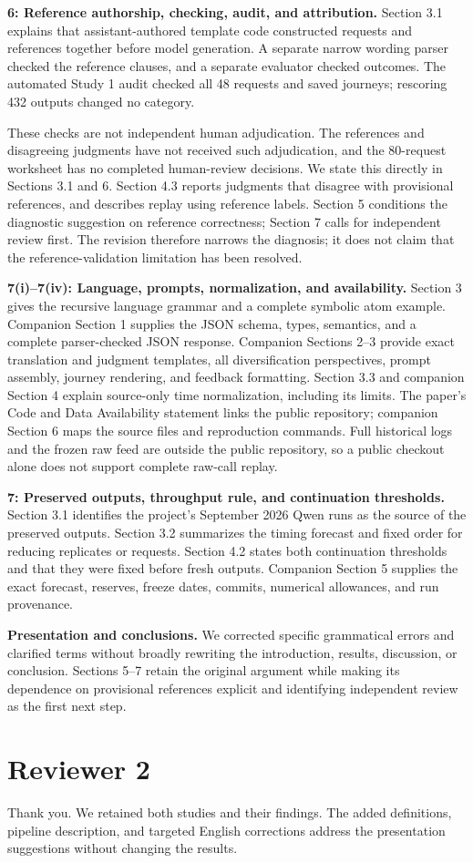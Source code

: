 \documentclass[11pt,a4paper]{scrartcl}
\begin{document}
\textbf{6: Reference authorship, checking, audit, and attribution.}
Section 3.1 explains that assistant-authored template code constructed requests and references together before model generation. A separate narrow wording parser checked the reference clauses, and a separate evaluator checked outcomes. The automated Study 1 audit checked all 48 requests and saved journeys; rescoring 432 outputs changed no category.

These checks are not independent human adjudication. The references and disagreeing judgments have not received such adjudication, and the 80-request worksheet has no completed human-review decisions. We state this directly in Sections 3.1 and 6. Section 4.3 reports judgments that disagree with provisional references, and describes replay using reference labels. Section 5 conditions the diagnostic suggestion on reference correctness; Section 7 calls for independent review first. The revision therefore narrows the diagnosis; it does not claim that the reference-validation limitation has been resolved.

\textbf{7(i)--7(iv): Language, prompts, normalization, and availability.}
Section 3 gives the recursive language grammar and a complete symbolic atom example. Companion Section 1 supplies the JSON schema, types, semantics, and a complete parser-checked JSON response. Companion Sections 2--3 provide exact translation and judgment templates, all diversification perspectives, prompt assembly, journey rendering, and feedback formatting. Section 3.3 and companion Section 4 explain source-only time normalization, including its limits. The paper's Code and Data Availability statement links the public repository; companion Section 6 maps the source files and reproduction commands. Full historical logs and the frozen raw feed are outside the public repository, so a public checkout alone does not support complete raw-call replay.

\textbf{7: Preserved outputs, throughput rule, and continuation thresholds.}
Section 3.1 identifies the project's September 2026 Qwen runs as the source of the preserved outputs. Section 3.2 summarizes the timing forecast and fixed order for reducing replicates or requests. Section 4.2 states both continuation thresholds and that they were fixed before fresh outputs. Companion Section 5 supplies the exact forecast, reserves, freeze dates, commits, numerical allowances, and run provenance.

\textbf{Presentation and conclusions.}
We corrected specific grammatical errors and clarified terms without broadly rewriting the introduction, results, discussion, or conclusion. Sections 5--7 retain the original argument while making its dependence on provisional references explicit and identifying independent review as the first next step.

\section*{Reviewer 2}

Thank you. We retained both studies and their findings. The added definitions, pipeline description, and targeted English corrections address the presentation suggestions without changing the results.
\end{document}
